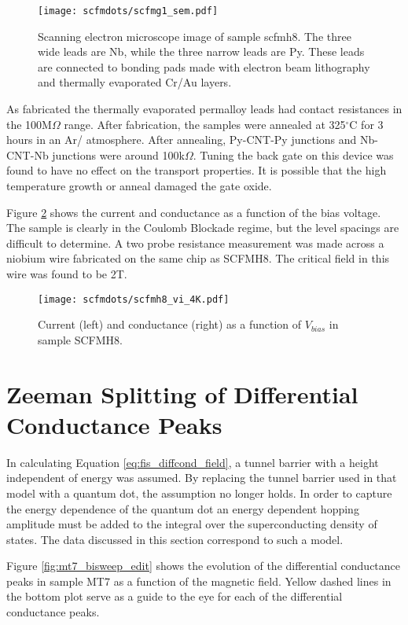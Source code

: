 \begin{figure}
    \centering
    \texttt{[image: scfmdots/scfmg1\_sem.pdf]}
    \caption{Scanning electron microscope image of sample scfmh8. The three wide leads are Nb, while the three narrow leads are Py. These leads are connected to bonding pads made with electron beam lithography and thermally evaporated Cr/Au layers.}
    \label{fig:scfmh8}
\end{figure}

As fabricated the thermally evaporated permalloy leads had contact resistances in the 100M$\Omega$ range. After fabrication, the samples were annealed at 325$^\circ$C for 3 hours in an Ar/ atmosphere. After annealing, Py-CNT-Py junctions and Nb-CNT-Nb junctions were around 100k$\Omega$. Tuning the back gate on this device was found to have no effect on the transport properties. It is possible that the high temperature growth or anneal damaged the gate oxide.

Figure \ref{fig:scfmh8_vi} shows the current and conductance as a function of the bias voltage. The sample is clearly in the Coulomb Blockade regime, but the level spacings are difficult to determine. A two probe resistance measurement was made across a niobium wire fabricated on the same chip as SCFMH8. The critical field in this wire was found to be 2T.

\begin{figure}
    \centering
    \texttt{[image: scfmdots/scfmh8\_vi\_4K.pdf]}
    \caption{Current (left) and conductance (right) as a function of $V_{bias}$ in sample SCFMH8.}
    \label{fig:scfmh8_vi}
\end{figure}

\section{Zeeman Splitting of Differential Conductance Peaks}

In calculating Equation \ref{eq:fis_diffcond_field}, a tunnel barrier with a height independent of energy was assumed. By replacing the tunnel barrier used in that model with a quantum dot, the assumption no longer holds. In order to capture the energy dependence of the quantum dot an energy dependent hopping amplitude must be added to the integral over the superconducting density of states. The data discussed in this section correspond to such a model.

Figure \ref{fig:mt7_bisweep_edit} shows the evolution of the differential conductance peaks in sample MT7 as a function of the magnetic field. Yellow dashed lines in the bottom plot serve as a guide to the eye for each of the differential conductance peaks.

